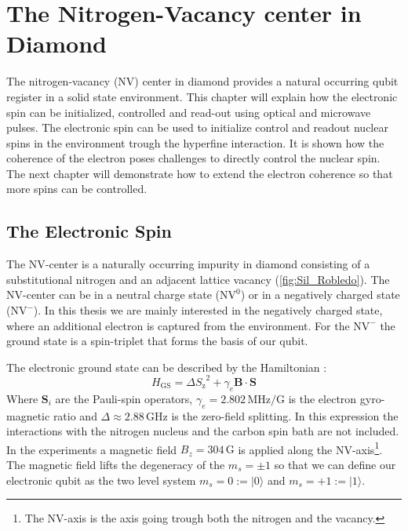 \chapter{The Nitrogen-Vacancy center in Diamond}
The nitrogen-vacancy (NV) center in diamond provides a natural occurring qubit register in a solid state environment.
This chapter will explain how the electronic spin can be initialized, controlled and read-out using optical and microwave pulses.
The electronic spin can be used to initialize control and readout nuclear spins in the environment trough the hyperfine interaction.
It is shown how the coherence of the electron poses challenges to directly control the nuclear spin.
The next chapter will demonstrate how to extend the electron coherence so that more spins can be controlled.

\section{The Electronic Spin}
The NV-center is a naturally occurring impurity in diamond consisting of a substitutional nitrogen and an adjacent lattice vacancy (\cref{fig:Sil_Robledo}).
The NV-center can be in a neutral charge state ($\mathrm{NV}^0$) or in a negatively charged state ($\mathrm{NV}^-$).
In this thesis we are mainly interested in the negatively charged state, where an additional electron is captured from the environment.
For the $\mathrm{NV}^-$ the ground state is a spin-triplet that forms the basis of our qubit.

The electronic ground state can be described by the Hamiltonian \citep{Bernien2014Control}:
 \begin{equation}
H_\mathrm{GS} = \Delta {{S}_\mathrm{z}}^2 + \gamma_e \bm{B} \cdot \bm{S}
\end{equation}
Where $\bm{S}_i$ are the Pauli-spin operators,  $\gamma_e  = 2.802\,\mathrm{ MHz/G}$  is the electron gyro-magnetic ratio and $\Delta \approx 2.88\, \mathrm{GHz}$ is the zero-field splitting.
In this expression the interactions with the nitrogen nucleus and the carbon spin bath are not included.
In the experiments a magnetic field $B_z = 304\,\mathrm{G}$ is applied along the NV-axis\footnote{The NV-axis is the axis going trough both the nitrogen and the vacancy. }.
The magnetic field lifts the degeneracy of the $m_s = \pm 1$ so that we can define our electronic qubit  as the two level system  $m_s=0:=|0\rangle$ and $m_s = +1 := |1\rangle$.


